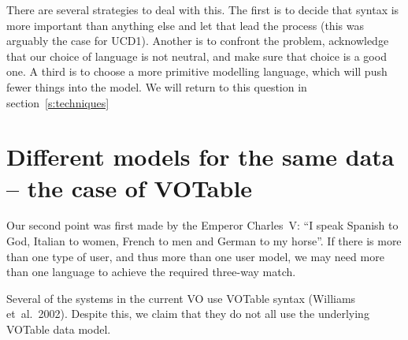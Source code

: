 \documentclass[11pt,twoside]{article}
\begin{document}

There are several strategies to deal with this.  The first is to
decide that syntax is more important than anything else and let that
lead the process (this was arguably the case for UCD1).  Another is to confront
the problem, acknowledge that our choice of language is not neutral,
and make sure that choice is a good one.  A third is to choose a
more primitive modelling language, which will push fewer things into
the model.  We will return to this question in section~\ref{s:techniques}



\section{Different models for the same data -- the case of VOTable}

Our second point was first made by the Emperor
Charles~V: ``I speak Spanish to God, Italian to women, French to men
and German to my horse''.
If there is more than one type of user, and thus more than one user
model, we may need more than one language to achieve the required three-way
match.

Several of the systems in the current VO use VOTable
syntax (Williams et~al.\ 2002).  Despite this, we claim that they do
not all use the underlying VOTable data model.
\end{document}
